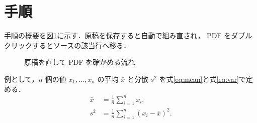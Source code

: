 \section{手順}\label{sec:method}

手順の概要を図\ref{fig:flow}に示す．原稿を保存すると自動で組み直され，
PDF をダブルクリックするとソースの該当行へ移る．

\begin{figure}[t]
  \centering
  
  \caption{原稿を直して PDF を確かめる流れ}
  \label{fig:flow}
\end{figure}

例として，$n$ 個の値 $x_1, \dots, x_n$ の平均 $\bar{x}$ と分散 $s^2$ を式\eqref{eq:mean}と式\eqref{eq:var}で定める．
\begin{align}
  \bar{x} &= \frac{1}{n} \sum_{i=1}^{n} x_i, \label{eq:mean} \\
  s^2 &= \frac{1}{n} \sum_{i=1}^{n} \left( x_i - \bar{x} \right)^2. \label{eq:var}
\end{align}
